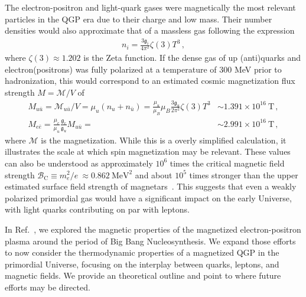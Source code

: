 \documentclass[epjST]{svjour}
\numberwithin{equation}{section}
\begin{document}
The electron-positron and light-quark gases were magnetically the most relevant particles in the QGP era due to their charge and low mass. Their number densities would also approximate that of a massless gas following the expression
\begin{align}
    n_{i} = \frac{3\mathfrak{g}_{i}}{4\pi^{2}}\zeta(3)T^{3}\,,
\end{align}
where \(\zeta(3)\approx1.202\) is the Zeta function. If the dense gas of up (anti)quarks and electron(positrons) was fully polarized at a temperature of \(300\) MeV prior to hadronization, this would correspond to an estimated cosmic magnetization flux strength \(M = \mathcal{M}/V\) of
\begin{align}
    M_{u\bar{u}} = \mathcal{M}_{u\bar{u}}/V = \mu_{u}(n_{u}+n_{\bar{u}}) = \frac{\mu_{u}}{\mu_{B}}\mu_{B}\frac{3\mathfrak{g}_{u}}{2\pi^{2}}\zeta(3)T^{3} & \sim 1.391\times10^{16}\ \mathrm{T}\,,\\
    M_{e\bar{e}} = \frac{\mu_{e}}{\mu_{u}} \frac{\mathfrak{g}_{e}}{\mathfrak{g}_{u}} M_{u\bar{u}} = & \sim 2.991\times10^{16}\ \mathrm{T}\,,
\end{align}
where \(\mathcal{M}\) is the magnetization. While this is a overly simplified calculation, it illustrates the scale at which spin magnetization may be relevant. These values can also be understood as approximately \(10^{6}\) times the critical magnetic field strength \(\mathcal{B}_\mathrm{C}\equiv m_{e}^{2}/e\ \approx 0.862\ \mathrm{MeV}^{2}\) and about \(10^5\) times stronger than the upper estimated surface field strength of magnetars~\cite{Kaspi:2017fwg}. This suggests that even a weakly polarized primordial gas would have a significant impact on the early Universe, with light quarks contributing on par with leptons.

In Ref.~\cite{Steinmetz:2023nsc,Steinmetz:2023ucp}, we explored the magnetic properties of the magnetized electron-positron plasma around the period of Big Bang Nucleosynthesis. We expand those efforts to now consider the thermodynamic properties of a magnetized QGP in the primordial Universe, focusing on the interplay between quarks, leptons, and magnetic fields. We provide an theoretical outline and point to where future efforts may be directed.

\end{document}
